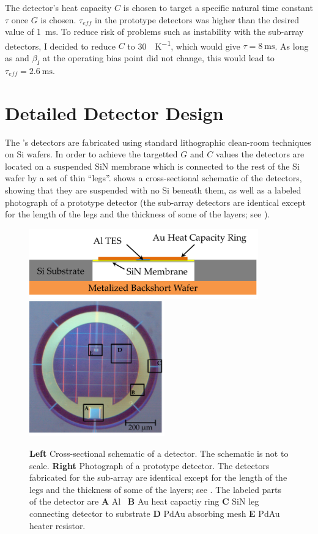 The detector's heat capacity $C$ is chosen to target a specific natural time constant $\tau$ once $G$ is chosen.
$\tau_{eff}$ in the prototype detectors was higher than the desired value of \SI{1}{\ms}.
To reduce risk of problems such as instability with the sub-array detectors, I decided to reduce $C$ to \SI{30}{\pJ\per\K}, which would give $\tau = \SI{8}{\ms}$.
As long as \Loop and $\beta_I$ at the operating bias point did not change, this would lead to $\tau_{eff} = \SI{2.6}{\ms}$.

\section{Detailed Detector Design} \label{sec:ch5-det-design}

The \Imager's detectors are fabricated using standard lithographic clean-room techniques on Si wafers.
In order to achieve the targetted $G$ and $C$ values the detectors are located on a suspended SiN membrane which is connected to the rest of the Si wafer by a set of thin ``legs''.
 shows a cross-sectional schematic of the detectors, showing that they are suspended with no Si beneath them, as well as a labeled photograph of a prototype detector (the sub-array detectors are identical except for the length of the legs and the thickness of some of the layers; see ).

\begin{figure}
\centering
\includegraphics[width=3.9in]{images/ch5-det-schematic.png}
\includegraphics[width=2.3in]{images/ch5-proto-pixel-labeled.png}
\caption{
  \textbf{Left} Cross-sectional schematic of a \Imager detector.
  The schematic is not to scale.
  \textbf{Right} Photograph of a prototype detector.
  The detectors fabricated for the sub-array are identical except for the length of the legs and the thickness of some of the layers; see .
  The labeled parts of the detector are \textbf{A} Al \TES\ \textbf{B} Au heat capactiy ring \textbf{C} SiN leg connecting detector to substrate \textbf{D} PdAu absorbing mesh \textbf{E} PdAu heater resistor.
}
\label{fig:ch5-det-layout}
\end{figure}

